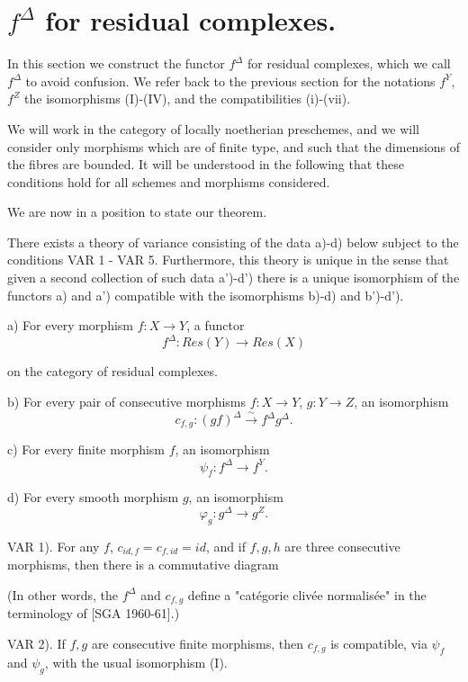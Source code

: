 \documentclass[12pt]{book}
\begin{document}
\setcounter{page}{318}
\section{$f^\Delta$ for residual complexes.}

In this section we construct the functor \(f^{\Delta}\) for residual complexes, which we call \(f^{\Delta}\) to avoid confusion. We refer back to the previous section for the notations \(f^{Y}\), \(f^{Z}\) the isomorphisms (I)-(IV), and the compatibilities (i)-(vii).

We will work in the category of locally noetherian preschemes, and we will consider only morphisms which are of finite type, and such that the dimensions of the fibres are bounded. It will be understood in the following that these conditions hold for all schemes and morphisms considered.

We are now in a position to state our theorem.

\begin{theorem}
There exists a theory of variance consisting of the data a)-d) below subject to the conditions VAR 1 - VAR 5. Furthermore, this theory is unique in the sense that given a second collection of such data a')-d') there is a unique isomorphism of the functors a) and a') compatible with the isomorphisms b)-d) and b')-d').

a) For every morphism \(f: X \to Y\), a functor
\[f^{\Delta}: Res(Y) \to Res(X)\]

\setcounter{page}{319}
on the category of residual complexes.

b) For every pair of consecutive morphisms \(f: X \to Y\), \(g: Y \to Z\), an isomorphism
\[c_{f,g}:(g f)^{\Delta} \stackrel{\sim}{\to} f^{\Delta} g^{\Delta}.\]

c) For every finite morphism \(f\), an isomorphism
\[\psi_{f}: f^{\Delta} \to f^{Y}.\]

d) For every smooth morphism \(g\), an isomorphism
\[\varphi_{g}: g^{\Delta} \to g^{Z}.\]
\end{theorem}

VAR 1). For any \(f\), \(c_{id,f}=c_{f,id}=id\), and if \(f, g, h\) are three consecutive morphisms, then there is a commutative diagram

\setcounter{page}{320}
(In other words, the \(f^{\Delta}\) and \(c_{f,g}\) define a "cat\'egorie cliv\'ee normalis\'ee" in the terminology of [SGA 1960-61].)

VAR 2). If \(f,g\) are consecutive finite morphisms, then \(c_{f,g}\) is compatible, via \(\psi_{f}\) and \(\psi_{g}\), with the usual isomorphism (I).
\end{document}
